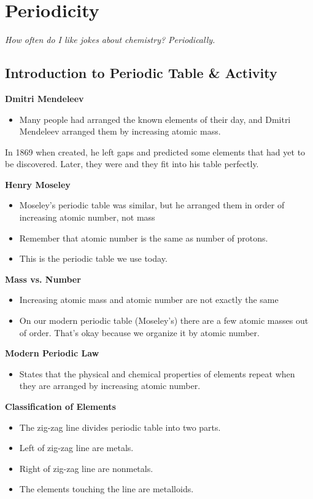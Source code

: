 \documentclass[../hchem.tex]{subfiles}
\begin{document}
\chapter{Periodicity}
\textit{How often do I like jokes about chemistry? Periodically.}

\section{Introduction to Periodic Table \& Activity}
\textbf{Dmitri Mendeleev}
\begin{itemize}
    \item Many people had arranged the known elements of their day, and Dmitri Mendeleev arranged them by increasing atomic mass.
\end{itemize}
In 1869 when created, he left gaps and predicted some elements that had yet to be discovered. Later, they were and they fit into his table perfectly.

\textbf{Henry Moseley}
\begin{itemize}
    \item Moseley's periodic table was similar, but he arranged them in order of increasing atomic number, not mass 
    \item Remember that atomic number is the same as number of protons.
    \item This is the periodic table we use today.
\end{itemize}

\textbf{Mass vs. Number}
\begin{itemize}
    \item Increasing atomic mass and atomic number are not exactly the same 
    \item On our modern periodic table (Moseley's) there are a few atomic masses out of order. That's okay because we organize it by atomic number.
\end{itemize}

\textbf{Modern Periodic Law}
\begin{itemize}
    \item States that the physical and chemical properties of elements repeat when they are arranged by increasing atomic number.
\end{itemize}

\textbf{Classification of Elements}
\begin{itemize}
    \item The zig-zag line divides periodic table into two parts.
    \item Left of zig-zag line are metals.
    \item Right of zig-zag line are nonmetals.
    \item The elements touching the line are metalloids. 
\end{itemize}
\end{document}
